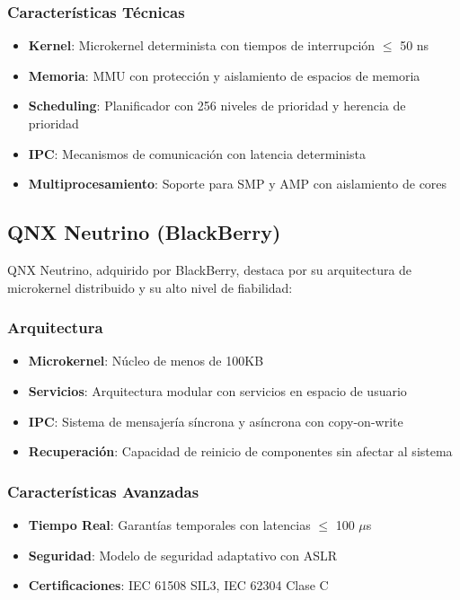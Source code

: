         \subsubsection{Características Técnicas}
            \begin{itemize}
                \item \textbf{Kernel}: Microkernel determinista con tiempos de interrupción $\le$ 50 ns
                \item \textbf{Memoria}: MMU con protección y aislamiento de espacios de memoria
                \item \textbf{Scheduling}: Planificador con 256 niveles de prioridad y herencia de prioridad
                \item \textbf{IPC}: Mecanismos de comunicación con latencia determinista
                \item \textbf{Multiprocesamiento}: Soporte para SMP y AMP con aislamiento de cores
            \end{itemize}

    \subsection{QNX Neutrino (BlackBerry)}
        QNX Neutrino, adquirido por BlackBerry, destaca por su arquitectura de microkernel distribuido y su alto nivel de fiabilidad:

        \subsubsection{Arquitectura}
            \begin{itemize}
                \item \textbf{Microkernel}: Núcleo de menos de 100KB
                \item \textbf{Servicios}: Arquitectura modular con servicios en espacio de usuario
                \item \textbf{IPC}: Sistema de mensajería síncrona y asíncrona con copy-on-write
                \item \textbf{Recuperación}: Capacidad de reinicio de componentes sin afectar al sistema
            \end{itemize}

        \subsubsection{Características Avanzadas}
            \begin{itemize}
                \item \textbf{Tiempo Real}: Garantías temporales con latencias $\le$ 100 $\mu$s
                \item \textbf{Seguridad}: Modelo de seguridad adaptativo con ASLR
                \item \textbf{Certificaciones}: IEC 61508 SIL3, IEC 62304 Clase C
            \end{itemize}

